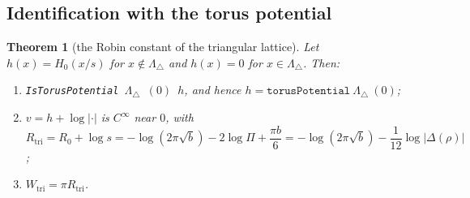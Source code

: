 \documentclass[11pt]{article}
\newtheorem{theorem}{Theorem}[section]
\theoremstyle{definition}
\theoremstyle{remark}
\newcommand{\Ltri}{\Lambda_{\triangle}}
\newcommand{\lean}[1]{\texttt{#1}}
\begin{document}
\subsection{Identification with the torus potential}

\begin{theorem}[the Robin constant of the triangular lattice]\label{thm:B}
Let $h(x)=H_0(x/s)$ for $x\notin\Ltri$ and $h(x)=0$ for $x\in\Ltri$. Then:
\begin{enumerate}
\item[(a)] \lean{IsTorusPotential}\ $\Ltri$\ $(0)$\ $h$, and hence $h=\lean{torusPotential}\ \Ltri\ (0)$;
\item[(b)] $v=h+\log|\cdot|$ is $C^\infty$ near $0$, with
\[
 R_{\mathrm{tri}}=R_0+\log s=-\log(2\pi\sqrt b)-2\log\Pi+\frac{\pi b}6=-\log(2\pi\sqrt b)-\frac1{12}\log|\Delta(\rho)|
\]
;
\item[(c)] $W_{\mathrm{tri}}=\pi R_{\mathrm{tri}}$.
\end{enumerate}
\end{theorem}
\end{document}
